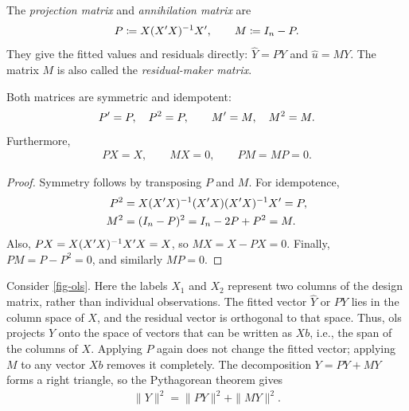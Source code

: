 \documentclass[a4paper,12pt]{article}
\begin{document}
\begin{definition}\label{def-projection-matrices}
	The \emph{projection matrix} and \emph{annihilation matrix} are
	\begin{align}
		P\coloneqq X(X^{\prime} X)^{-1} X^{\prime},
		\qquad M\coloneqq I_n-P.
	\end{align}
	They give the fitted values and residuals directly: $\widehat Y=PY$ and $\widehat u=MY$.
	The matrix $M$ is also called the \emph{residual-maker matrix}.
\end{definition}


\begin{proposition}\label{prop-projection-matrices}
	Both matrices are symmetric and idempotent:
	\begin{align}
		P^{\prime}=P,\quad P^2=P,
		\qquad M^{\prime}=M,\quad M^2=M.
	\end{align}
	Furthermore,
	\begin{align}
		PX=X,\qquad MX=0,\qquad PM=MP=0.
	\end{align}
\end{proposition}
\begin{proof}
	Symmetry follows by transposing $P$ and $M$.
	For idempotence,
	\begin{align*}
		P^2&=X(X^{\prime} X)^{-1}(X^{\prime} X)(X^{\prime} X)^{-1} X^{\prime}=P,\\
		M^2&=(I_n-P)^2=I_n-2P+P^2=M.
	\end{align*}
	Also, $PX=X(X^{\prime} X)^{-1} X^{\prime} X=X$, so $MX=X-PX=0$.
	Finally, $PM=P-P^2=0$, and similarly $MP=0$.
\end{proof}

\begin{remark}
	Consider \autoref{fig-ols}.
	Here the labels $X_1$ and $X_2$ represent two columns of the design matrix, rather than individual observations.
	The fitted vector $\widehat Y$ or $PY$ lies in the column space of $X$,
	and the residual vector is orthogonal to that space.
	Thus, \gls{ols} projects $Y$ onto the space of vectors that can be written as $X b$,
	i.e., the span of the columns of $X$.
	Applying $P$ again does not change the fitted vector; applying $M$ to any vector $Xb$ removes it completely.
	The decomposition $Y=PY+MY$ forms a right triangle, so the Pythagorean theorem gives
	\begin{align}\label{eq-uncentered-pythagoras}
		\|Y\|^2=\|PY\|^2+\|MY\|^2.
	\end{align}
\end{remark}
\end{document}
